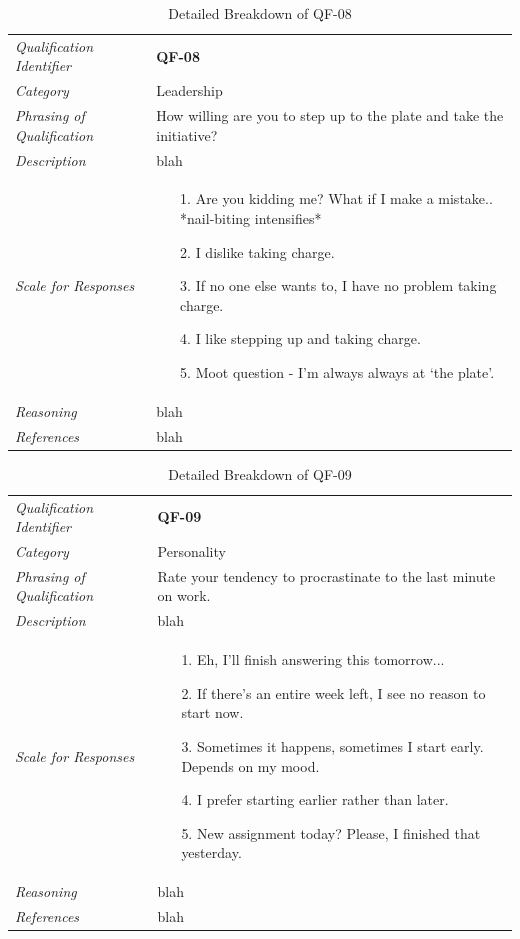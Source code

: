 \documentclass[12pt,letterpaper]{article}
\begin{document}
\begin{table}[H]
	\caption{Detailed Breakdown of QF-08}
	\begin{tabu} to 
		\toprule
		Qualification Identifier & {\bf QF-08}\\
		Category & Leadership \\
		Phrasing of Qualification & How willing are you to step up to the plate and take the initiative?\\
		Description & blah\\
		Scale for Responses &
		\begin{minipage}[t]{\linewidth}
			\begin{enumerate}
				\item[1.] Are you kidding me? What if I make a mistake.. *nail-biting intensifies*
				\item[2.] I dislike taking charge.
				\item[3.] If no one else wants to, I have no problem taking charge.
				\item[4.] I like stepping up and taking charge.
				\item[5.] Moot question - I'm always always at `the plate'.
			\end{enumerate}
		\end{minipage}\\
		Reasoning & blah\\
		References & blah\\
		\toprule
	\end{tabu}
\end{table}

\begin{table}[H]
	\caption{Detailed Breakdown of QF-09}
	\begin{tabu} to 
		\toprule
		Qualification Identifier & {\bf QF-09}\\
		Category & Personality \\
		Phrasing of Qualification & Rate your tendency to procrastinate to the last minute on work. \\
		Description & blah\\
		Scale for Responses &
		\begin{minipage}[t]{\linewidth}
			\begin{enumerate}
				\item[1.] Eh, I'll finish answering this tomorrow...
				\item[2.] If there's an entire week left, I see no reason to start now.
				\item[3.] Sometimes it happens, sometimes I start early. Depends on my mood.
				\item[4.] I prefer starting earlier rather than later.
				\item[5.] New assignment today? Please, I finished that yesterday.
			\end{enumerate}
		\end{minipage}\\
		Reasoning & blah\\
		References & blah\\
		\toprule
	\end{tabu}
\end{table}
\end{document}
